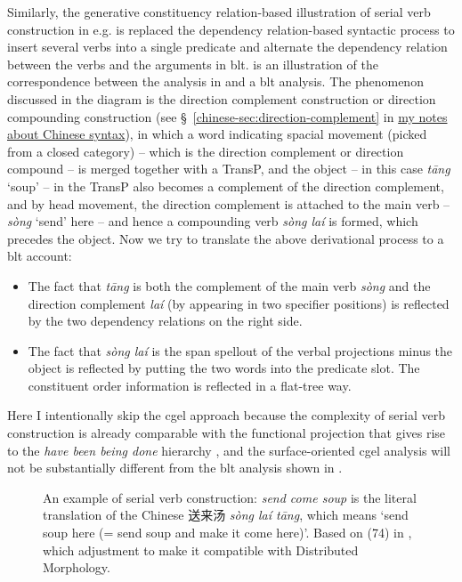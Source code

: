 \documentclass[UTF8, a4paper, oneside, scheme=plain]{ctexart}
\newcommand*{\citesec}[1]{\S~{#1}}
\newcommand*{\corpus}[1]{\emph{#1}}
\newcommand{\chinesenote}{\href{../Chinese/main.pdf}{my notes about Chinese syntax}}
\begin{document}
Similarly, the generative constituency relation-based illustration 
of serial verb construction in e.g. \citet{chen2016mandarin}
is replaced the dependency relation-based syntactic process to insert several verbs into a single predicate 
and alternate the dependency relation between the verbs and the arguments in \ac{blt}.
 is an illustration of 
the correspondence between the analysis in \citet{chen2016mandarin} and a \ac{blt} analysis.
The phenomenon discussed in the diagram is the direction complement construction
or direction compounding construction 
(see \citesec{\ref{chinese-sec:direction-complement}} in \chinesenote),
in which a word indicating spacial movement (picked from a closed category) 
-- which is the direction complement or direction compound -- 
is merged together with a TransP,
and the object -- in this case \corpus{t\={a}ng} `soup' -- in the TransP
also becomes a complement of the direction complement,
and by head movement, the direction complement is attached to the main verb 
-- \corpus{s\`{o}ng} `send' here -- 
and hence a compounding verb \corpus{s\`{o}ng la\'{i}} is formed,
which precedes the object.
Now we try to translate the above derivational process to a \ac{blt} account:
\begin{itemize}
    \item The fact that \corpus{t\={a}ng} is both 
    the complement of the main verb \corpus{s\`{o}ng}
    and the direction complement \corpus{la\'{i}} 
    (by appearing in two specifier positions)
    is reflected by the two dependency relations 
    on the right side.
    \item The fact that \corpus{s\`{o}ng la\'{i}} is the span spellout of the verbal projections minus the object 
    is reflected by putting the two words into the predicate slot.
    The constituent order information is reflected in a flat-tree way.
\end{itemize}
Here I intentionally skip the \ac{cgel} approach 
because the complexity of serial verb construction
is already comparable with the functional projection 
that gives rise to the \corpus{have been being done} hierarchy
\citep{ramchand2014deriving},
and the surface-oriented \ac{cgel} analysis will not be substantially different 
from the \ac{blt} analysis shown in .

\begin{figure}
    \centering
    
    \caption{An example of serial verb construction: 
    \corpus{send come soup} is the literal translation of the Chinese 送来汤 \corpus{s\`{o}ng la\'{i} t\={a}ng},
    which means `send soup here (= send soup and make it come here)'.
    Based on (74) in \citet{chen2016mandarin},
    which adjustment to make it compatible with Distributed Morphology.}
    \label{fig:serial-verb-construction-1}
\end{figure}
\end{document}
